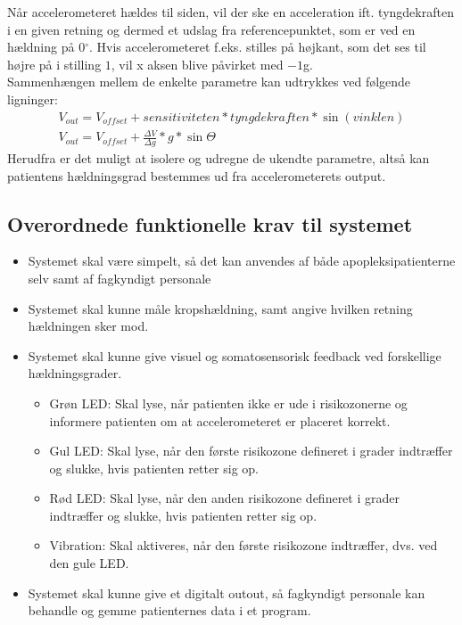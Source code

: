 Når accelerometeret hældes til siden, vil der ske en acceleration ift. tyngdekraften i en given retning og dermed et udslag fra referencepunktet, som er ved en hældning på 0$^{\circ}$. Hvis accelerometeret f.eks. stilles på højkant, som det ses til højre på  i stilling $1$, vil x aksen blive påvirket med $-1$g.\cite{Devices2009} \\
Sammenhængen mellem de enkelte parametre kan udtrykkes ved følgende ligninger: 
\begin{align}
	V_{out} = V_{offset} + sensitiviteten * tyngdekraften * \sin(vinklen) \\
	V_{out} = V_{offset} + \frac{\Delta V}{\Delta g} * g * \sin \Theta
\end{align}
Herudfra er det muligt at isolere og udregne de ukendte parametre, altså kan patientens hældningsgrad bestemmes ud fra accelerometerets output.

\subsection{Overordnede funktionelle krav til systemet}\label{FunkKrav}
\begin{itemize}
	\item Systemet skal være simpelt, så det kan anvendes af både apopleksipatienterne selv samt af fagkyndigt personale
	\item Systemet skal kunne måle kropshældning, samt angive hvilken retning hældningen sker mod. 
	\item Systemet skal kunne give visuel og somatosensorisk feedback ved forskellige hældningsgrader.
	\begin{itemize}
		\item Grøn LED: Skal lyse, når patienten ikke er ude i risikozonerne og informere patienten om at accelerometeret er placeret korrekt.  
		\item Gul LED: Skal lyse, når den første risikozone defineret i grader indtræffer og slukke, hvis patienten retter sig op.
		\item Rød LED: Skal lyse, når den anden risikozone defineret i grader indtræffer og slukke, hvis patienten retter sig op.
		\item Vibration: Skal aktiveres, når den første risikozone indtræffer, dvs. ved den gule LED.
	\end{itemize}
	\item Systemet skal kunne give et digitalt outout, så fagkyndigt personale kan behandle og gemme patienternes data i et program.
\end{itemize}


